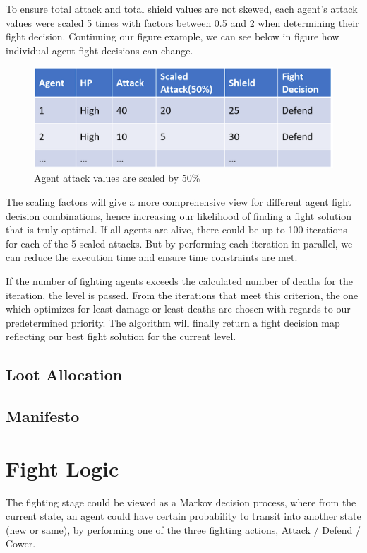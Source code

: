 To ensure total attack and total shield values are not skewed, each agent's attack values were scaled 5 times with factors between 0.5 and 2 when determining their fight decision. Continuing our figure example, we can see below in figure how individual agent fight decisions can change.
\begin{figure}[htb]
    \centering
    \includegraphics[width=1\textwidth]{008_team_5_agent_design/images/scaled-attack.PNG}
    \caption{Agent attack values are scaled by 50\%}
    \label{scaledattack}
\end{figure}

The scaling factors will give a more comprehensive view for different agent fight decision combinations, hence increasing our likelihood of finding a fight solution that is truly optimal. If all agents are alive, there could be up to 100 iterations for each of the 5 scaled attacks. But by performing each iteration in parallel, we can reduce the execution time and ensure time constraints are met.

If the number of fighting agents exceeds the calculated number of deaths for the iteration, the level is passed. From the iterations that meet this criterion, the one which optimizes for least damage or least deaths are chosen with regards to our predetermined priority. The algorithm will finally return a fight decision map reflecting our best fight solution for the current level.



\subsection{Loot Allocation}
\subsection{Manifesto}



\section{Fight Logic}
The fighting stage could be viewed as a Markov decision process, where from the current state, an agent could have certain probability to transit into another state (new or same), by performing one of the three fighting actions, Attack / Defend / Cower.

